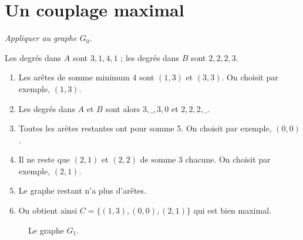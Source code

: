 \section{Un couplage maximal}
\begin{Exercise}\it
Appliquer  au graphe $G_0$.
\end{Exercise}
\begin{Answer}
Les degrés dans $A$ sont $3,1,4,1$ ; les degrés dans $B$ sont $2,2,2,3$.
\begin{enumerate}
\item Les arêtes de somme minimum 4 sont $(1, 3)$ et $(3, 3)$. On choisit par exemple, $(1, 3)$.
\item Les degrés dans $A$ et $B$ sont alors $3,\_,3,0$ et $2,2,2,\_$.
\item Toutes les arêtes restantes ont pour somme 5. On choisit par exemple, $(0, 0)$.
\item Il ne reste que $(2 , 1)$ et $(2,2)$ de somme 3 chacune. On choisit par exemple, $(2,1)$.
\item Le graphe restant n'a plus d'arêtes.
\item On obtient ainsi $C=\{(1, 3), (0, 0), (2, 1)\}$ qui est bien maximal.
\end{enumerate}
\end{Answer}
\begin{figure}[h]
\centering
{}
\caption{Le graphe $G_1$.}
\end{figure}
